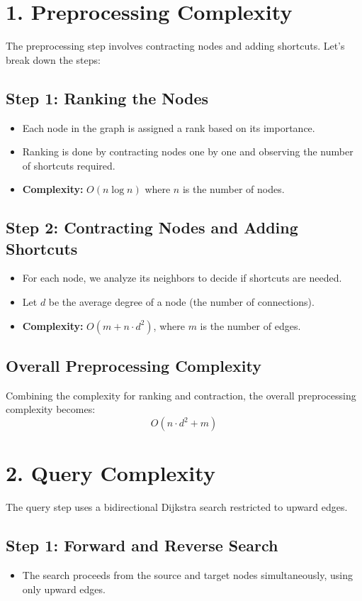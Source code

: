 \begin{appendices}
	\section*{1. Preprocessing Complexity}
	The preprocessing step involves contracting nodes and adding shortcuts. Let's break down the steps:
	
	\subsection*{Step 1: Ranking the Nodes}
	\begin{itemize}
		\item Each node in the graph is assigned a rank based on its importance.
		\item Ranking is done by contracting nodes one by one and observing the number of shortcuts required.
		\item \textbf{Complexity:} \(O(n \log n)\) where \(n\) is the number of nodes.
	\end{itemize}
	
	\subsection*{Step 2: Contracting Nodes and Adding Shortcuts}
	\begin{itemize}
		\item For each node, we analyze its neighbors to decide if shortcuts are needed.
		\item Let \(d\) be the average degree of a node (the number of connections).
		\item \textbf{Complexity:} \(O(m + n \cdot d^2)\), where \(m\) is the number of edges.
	\end{itemize}
	
	\subsection*{Overall Preprocessing Complexity}
	Combining the complexity for ranking and contraction, the overall preprocessing complexity becomes:
	\[
	O(n \cdot d^2 + m)
	\]
	
	\section*{2. Query Complexity}
	The query step uses a bidirectional Dijkstra search restricted to upward edges.
	
	\subsection*{Step 1: Forward and Reverse Search}
	\begin{itemize}
		\item The search proceeds from the source and target nodes simultaneously, using only upward edges.
	\end{itemize}
	

\end{appendices}
